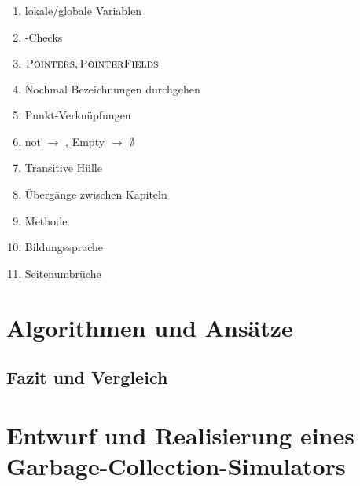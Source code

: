 
\listfiles


\listoftodos

\begin{enumerate}
	\item lokale/globale Variablen
	\item {}-Checks
	\item $\textsc{Pointers}, \textsc{PointerFields}$
	\item Nochmal Bezeichnungen durchgehen
	\item Punkt-Verknüpfungen
	\item not $\rightarrow$ \NOT, Empty $\rightarrow$ $\emptyset$
	\item Transitive Hülle
	\item Übergänge zwischen Kapiteln
	\item Methode
	\item Bildungssprache
	\item Seitenumbrüche
\end{enumerate}



\cleardoublepage

\setcounter{page}{1}
\pagestyle{maincontentstyle}


\part{Algorithmen und Ansätze}




\chapter{Fazit und Vergleich}		%

\part{Entwurf und Realisierung eines Garbage-Collection-Simulators}

\cleardoublepage






